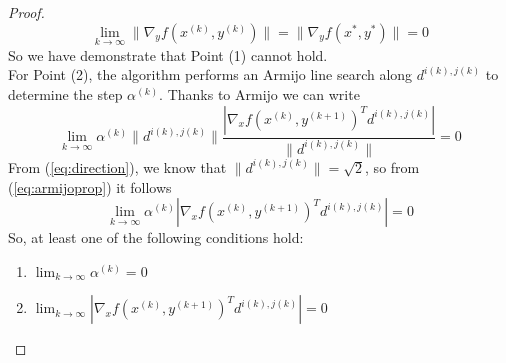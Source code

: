 \begin{proof}
\begin{equation}
\lim_{k \rightarrow \infty} \parallel \nabla_y f(x^{(k)}, y^{(k)}) \parallel =  \parallel \nabla_y f(x^{*}, y^{*}) \parallel = 0
\end{equation}
So we have demonstrate that Point (1) cannot hold.\\
For Point (2), the algorithm performs an Armijo line search along $d^{i(k),j(k)}$ to determine the step $\alpha^{(k)}$. Thanks to Armijo we can write
\begin{equation}\label{eq:armijoprop}
\lim_{k \rightarrow \infty} \alpha^{(k)} \parallel d^{i(k),j(k)} \parallel \frac{ \left| \nabla_x f(x^{(k)}, y^{(k+1)})^T d^{i(k),j(k)} \right|}{\parallel d^{i(k),j(k)} \parallel} = 0
\end{equation}
From (\ref{eq:direction}), we know that $\parallel d^{i(k),j(k)} \parallel = \sqrt{2}$, so from (\ref{eq:armijoprop}) it follows
\begin{equation}
\lim_{k \rightarrow \infty} \alpha^{(k)}  \left| \nabla_x f(x^{(k)}, y^{(k+1)})^T d^{i(k),j(k)} \right| = 0
\end{equation}
So, at least one of the following conditions hold:
\begin{enumerate}
\item $\lim_{k \rightarrow \infty} \alpha^{(k)} = 0$
\item $\lim_{k \rightarrow \infty} \left| \nabla_x f(x^{(k)}, y^{(k+1)})^T d^{i(k),j(k)} \right| = 0$
\end{enumerate}
\end{proof}
